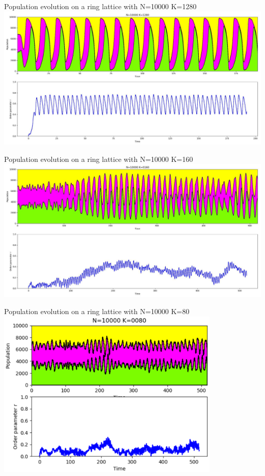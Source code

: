 \documentclass[serif,mathserif]{beamer}
\begin{document}
\begin{frame}
    \centering
    Population evolution on a ring lattice with N=10000 K=1280\\
    \vspace{0.8cm}
    \includegraphics[width=\textwidth]{./pop-evolution-stacked-K_1280.eps}
\end{frame}

\begin{frame}
    \centering
    Population evolution on a ring lattice with N=10000 K=160\\
    \vspace{0.8cm}
    \includegraphics[width=\textwidth]{./pop-evolution-stacked-K_160.eps}
\end{frame}

\begin{frame}
    \centering
    Population evolution on a ring lattice with N=10000 K=80\\
    \vspace{0.8cm}
    \includegraphics[width=0.8\textwidth]{./pop-evolution-stacked-K_80.eps}
\end{frame}
\end{document}
